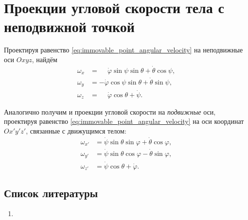 \section{Проекции угловой скорости тела с неподвижной точкой}

Проектируя равенство \ref{eq:immovable_point_angular_velocity} на неподвижные
оси $Oxyz$, найдём
\begin{equation}
  \begin{aligned}
    \omega_x &= \phantom{-} \dot{\varphi} \sin\psi \sin\theta +
      \dot{\theta} \cos\psi, \\
    \omega_y &= - \dot{\varphi} \cos\psi \sin\theta + \dot{\theta} \sin\psi, \\
    \omega_z &= \phantom{-} \dot{\varphi} \cos\theta + \dot{\psi}.
  \end{aligned}
\end{equation}

Аналогично получим и проекции угловой скорости на \textit{подвижные} оси,
проектируя равенство \ref{eq:immovable_point_angular_velocity} на оси координат
$Ox'y'z'$, связанные с движущимся телом:
\begin{equation}
  \begin{aligned}
    \omega_{x'} &= \dot{\psi} \sin\theta \sin\varphi + \dot{\theta}
      \cos\varphi, \\
    \omega_{y'} &= \dot{\psi} \sin\theta \cos\varphi - \dot{\theta}
      \sin\varphi, \\
    \omega_{z'} &= \dot{\psi} \cos\theta + \dot{\varphi}.
  \end{aligned}
\end{equation}

\subsection{Список литературы}
\begin{enumerate}
  \item \cite{lourie}
\end{enumerate}

